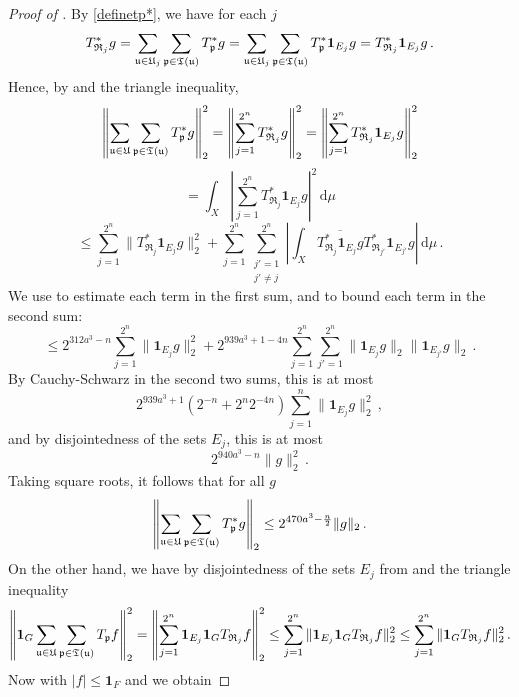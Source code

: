 \begin{proof}[Proof of ]
    \leanok
    By \eqref{definetp*}, we have for each $j$
    $$
        T_{\mathfrak{R}_j}^*g = \sum_{{\mathfrak u} \in {\mathfrak U}_j} \sum_{{\mathfrak p} \in {\mathfrak T}({\mathfrak u})} T_{{\mathfrak p}}^* g = \sum_{{\mathfrak u} \in {\mathfrak U}_j} \sum_{{\mathfrak p} \in {\mathfrak T}({\mathfrak u})} T_{{\mathfrak p}}^* \mathbf{1}_{E_j} g = T_{\mathfrak{R}_j}^* \mathbf{1}_{E_j} g\,.
    $$
    Hence, by  and the triangle inequality,
    $$
        \left\|\sum_{{\mathfrak u} \in {\mathfrak U}} \sum_{{\mathfrak p} \in {\mathfrak T}({\mathfrak u})} T^*_{{\mathfrak p}} g\right\|_2^2 = \left\|\sum_{j = 1}^{2^n} T^*_{\mathfrak{R}_{j}} g\right\|_2^2 = \left\|\sum_{j=1}^{2^n} T^*_{\mathfrak{R}_{j}} \mathbf{1}_{E_j} g\right\|_2^2
    $$
    $$
        = \int_X \left|\sum_{j=1}^{2^n} T^*_{\mathfrak{R}_{j}} \mathbf{1}_{E_j} g\right|^2 \, \mathrm{d}\mu
    $$
    $$
        \le \sum_{j=1}^{2^n} \|T_{\mathfrak{R}_j}^* \mathbf{1}_{E_j} g\|_2^2 + \sum_{j =1}^{2^n} \sum_{\substack{j' = 1\\j' \ne j}}^{2^n} \left| \int_X \overline{ T_{\mathfrak{R}_j}^* \mathbf{1}_{E_j} g} T_{\mathfrak{R}_{j'}}^* \mathbf{1}_{E_{j'}} g \right| \, \mathrm{d}\mu\,.
    $$
    We use  to estimate each term in the first sum, and  to bound each term in the second sum:
    $$
        \le 2^{312a^3-n} \sum_{j = 1}^{2^n} \|\mathbf{1}_{E_j} g\|_2^2 + 2^{939a^3+1-4n}\sum_{j=1}^{2^n}\sum_{j' = 1}^{2^n} \|\mathbf{1}_{E_j} g\|_2 \|\mathbf{1}_{E_{j'}}g\|_2\,.
    $$
    By Cauchy-Schwarz in the second two sums, this is at most
    $$
        2^{939a^3+1} (2^{-n} + 2^{n}2^{-4n}) \sum_{j = 1}^n \|\mathbf{1}_{E_j} g\|_2^2\,,
    $$
    and by disjointedness of the sets $E_j$, this is at most
    $$
        2^{940a^3 - n} \|g\|_2^2\,.
    $$
    Taking square roots, it follows that for all $g$
    \begin{equation}
        \label{eq-forest-bound-1}
        \left\|\sum_{{\mathfrak u} \in {\mathfrak U}} \sum_{{\mathfrak p} \in {\mathfrak T}({\mathfrak u})} T_{{\mathfrak p}}^* g\right\|_2 \le 2^{470a^3-\frac{n}{2}} \|g\|_2\,.
    \end{equation}
    On the other hand, we have by disjointedness of the sets $E_j$ from  and the triangle inequality
    $$
        \left\|\mathbf{1}_G \sum_{{\mathfrak u} \in {\mathfrak U}} \sum_{{\mathfrak p} \in {\mathfrak T}({\mathfrak u})} T_{{\mathfrak p}} f\right\|_2^2 = \left\|\sum_{j=1}^{2^n} \mathbf{1}_{E_j} \mathbf{1}_G T_{\mathfrak{R}_{j}} f\right\|_2^2 \le \sum_{j = 1}^{2^n} \|\mathbf{1}_{E_j} \mathbf{1}_G T_{\mathfrak{R}_{j}} f\|_2^2 \le \sum_{j = 1}^{2^n} \|\mathbf{1}_G T_{\mathfrak{R}_{j}} f\|_2^2\,.
    $$
    Now with $|f| \le \mathbf{1}_F$ and  we obtain

\end{proof}
